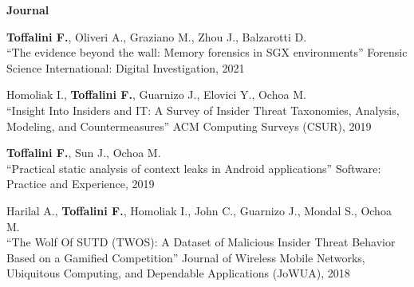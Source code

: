 \textbf{Journal}\begin{enumerate}[label={[J\arabic*]},leftmargin=5mm]
\item \textbf{Toffalini F.}, Oliveri A., Graziano M., Zhou J., Balzarotti D.\\``The evidence beyond the wall: Memory forensics in SGX environments'' Forensic Science International: Digital Investigation, 2021
\item Homoliak I., \textbf{Toffalini F.}, Guarnizo J., Elovici Y., Ochoa M.\\``Insight Into Insiders and IT: A Survey of Insider Threat Taxonomies, Analysis, Modeling, and Countermeasures'' ACM Computing Surveys (CSUR), 2019
\item \textbf{Toffalini F.}, Sun J., Ochoa M.\\``Practical static analysis of context leaks in Android applications'' Software: Practice and Experience, 2019
\item Harilal A., \textbf{Toffalini F.}, Homoliak I., John C., Guarnizo J., Mondal S., Ochoa M.\\``The Wolf Of SUTD (TWOS): A Dataset of Malicious Insider Threat Behavior Based on a Gamified Competition'' Journal of Wireless Mobile Networks, Ubiquitous Computing, and Dependable Applications (JoWUA), 2018
\end{enumerate}
